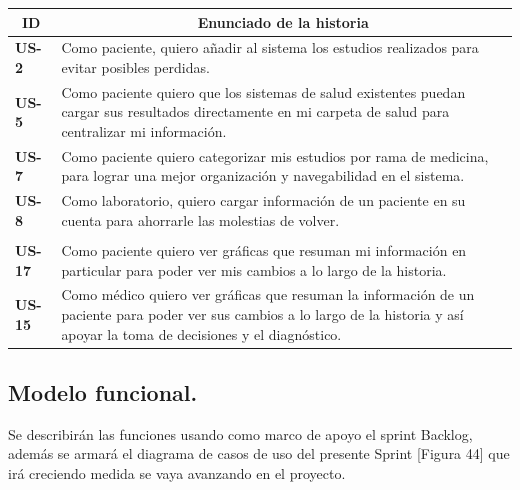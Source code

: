\documentclass[a4paper,12pt]{article}
\begin{document}
\begin{table}[h]
    \label{US-Sprint3}
    \centering
	\begin{tabular}{|l|p{9cm}|}
	\hline
        \multicolumn{1}{|c|}{\textbf{ID}} &
        \multicolumn{1}{|c|}{\textbf{Enunciado de la historia}} \\          
    \hline
        \textbf{US-2 } & Como paciente, quiero añadir al sistema los estudios realizados para evitar posibles perdidas.\\
     \hline 
        \textbf{US-5 } & Como paciente quiero que los sistemas de salud existentes puedan cargar sus resultados directamente en mi carpeta de salud para centralizar mi información. \\
      \hline 
        \textbf{US-7} & Como paciente quiero categorizar mis estudios por rama de medicina, para lograr una mejor organización y navegabilidad en el sistema. \\
       \hline 
        \textbf{US-8} & Como laboratorio, quiero cargar información de un paciente en su cuenta para ahorrarle las molestias de volver. \\
        \\
    \hline 
	    \textbf{US-17} &   Como paciente quiero ver gráficas que resuman mi información en particular para poder ver mis cambios a lo largo de la historia.\\
    \hline        
        \textbf{US-15} & Como médico quiero ver gráficas que resuman la información de un paciente para poder ver sus cambios a lo largo de la historia y así apoyar la toma de decisiones y el diagnóstico.\\
    \hline
    \end{tabular}

\end{table}

\subsection{ Modelo funcional.} 
Se describirán las funciones usando como marco de apoyo el sprint Backlog,
además se armará el diagrama de casos de uso del presente Sprint [Figura 44] que
irá creciendo medida se vaya avanzando en el proyecto.

\end{document}
